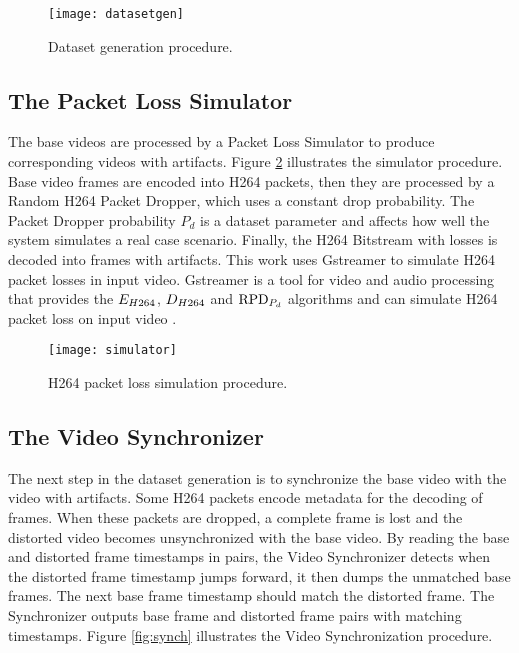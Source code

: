 \begin{figure} [!h]
  \centering
  
  \texttt{[image: datasetgen]}
  
  \caption{Dataset generation procedure.}
  \label{fig:datasetgen}

\end{figure}

\subsection{The Packet Loss Simulator}
\label{sec:sol_simulation}

The base videos are processed by a Packet Loss Simulator to produce corresponding videos with artifacts. Figure \ref{fig:simulator} illustrates the simulator procedure. Base video frames are encoded into H264 packets, then they are processed by a Random H264 Packet Dropper, which uses a constant drop probability. The Packet Dropper probability $P_d$ is a dataset parameter and affects how well the system simulates a real case scenario. Finally, the H264 Bitstream with losses is decoded into frames with artifacts. This work uses Gstreamer to simulate H264 packet losses in input video. Gstreamer is a tool for video and audio processing that provides the $E_{H264}$, $D_{H264}$ and $\text{RPD}_{P_d}$ algorithms and can simulate H264 packet loss on input video \cite{gstreamer}.

\begin{figure} [!h]
  \centering
  
  \texttt{[image: simulator]}
  
  \caption{H264 packet loss simulation procedure.}
  \label{fig:simulator}

\end{figure}

\subsection{The Video Synchronizer}
\label{sec:sol_synch}

The next step in the dataset generation is to synchronize the base video with the video with artifacts. Some H264 packets encode metadata for the decoding of frames. When these packets are dropped, a complete frame is lost and the distorted video becomes unsynchronized with the base video. By reading the base and distorted frame timestamps in pairs, the Video Synchronizer detects when the distorted frame timestamp jumps forward, it then dumps the unmatched base frames. The next base frame timestamp should match the distorted frame. The Synchronizer outputs base frame and distorted frame pairs with matching timestamps. Figure \ref{fig:synch} illustrates the Video Synchronization procedure.

